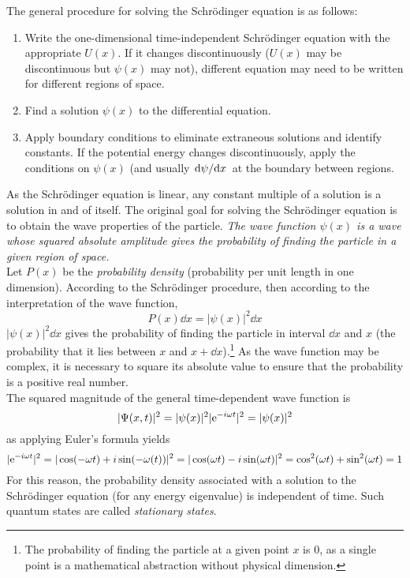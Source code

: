 \documentclass{subfiles}
\begin{document}
		The general procedure for solving the Schr\"odinger equation is as follows:
			\begin{enumerate}
				\item
					Write the one-dimensional time-independent	Schr\"odinger equation with the appropriate \(U(x)\). If it changes discontinuously (\(U(x)\) may be discontinuous but \(\psi(x)\) may not), different equation may need to be written for different regions of space.
				\item
					Find a solution \(\psi(x)\) to the differential equation. 
				\item
					Apply boundary conditions to eliminate extraneous solutions and identify constants. If the potential energy changes discontinuously, apply the conditions on \(\psi(x)\) (and usually \(\dv*{\psi}{x}\) at the boundary between regions.
			\end{enumerate}
		As the Schr\"odinger equation is linear, any constant multiple of a solution is a solution in and of itself.
			The original goal for solving the Schr\"odinger equation is to obtain the wave properties of the particle. \textit{The wave function \(\psi(x)\) is a wave whose squared absolute amplitude gives the probability of finding the particle in a given region of space.} \\
			Let \(P(x)\) be the \textit{probability density} (probability per unit length in one dimension). According to the Schr\"odinger procedure, then according to the interpretation of the wave function,
				\[P(x)\dd{x} = |\psi(x)|^2\dd{x}\]
				\(|\psi(x)|^2\dd{x}\) gives the probability of finding the particle in interval \(\dd{x}\) and \(x\) (the probability that it lies between \(x\) and \(x + \dd{x}\)).\footnote{The probability of finding the particle at a given point \(x\) is 0, as a single point is a mathematical abstraction without physical dimension.} As the wave function may be complex, it is necessary to square its absolute value to ensure that the probability is a positive real number. \\
			The squared magnitude of the general time-dependent wave function is
				\[
					|\Psi(x, t)|^2 = |\psi(x)|^2|\text{e}^{-i\omega t}|^2
						= |\psi(x)|^2
				\]
				as applying Euler's formula yields
				\[
					|\text{e}^{-i\omega t}|^2 = |\cos(-\omega t) + i\sin(-\omega(t))|^2
						= |\cos(\omega t) - i\sin(\omega t)|^2
						= \cos^2(\omega t) + \sin^2(\omega t)
						= 1
				\]
				For this reason, the probability density associated with a solution to the Schr\"odinger equation (for any energy eigenvalue) is independent of time. Such quantum states are called \textit{stationary states}. \\
\end{document}
